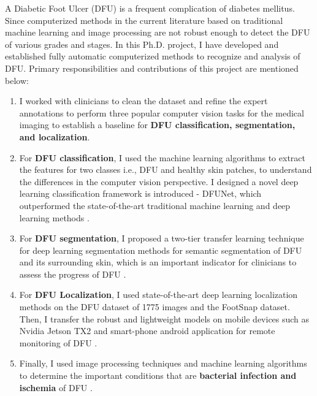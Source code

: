 \documentclass[10pt,a4paper]{article} %
\begin{document}
	\spacedhrule{2em}{-0.6em} %
	
	
	
	
	
	
	
	
	
	\inlineheadsection 
	{A Diabetic Foot Ulcer (DFU) is a frequent complication of diabetes mellitus.} {Since computerized methods in the current literature based on traditional machine learning and image processing are not robust enough to detect the DFU of various grades and stages. In this Ph.D. project, I have developed and established fully automatic computerized methods to recognize and analysis of DFU. Primary responsibilities and contributions of this project are mentioned below:} 
	
	\begin{enumerate}
		\item I worked with clinicians to clean the dataset and refine the expert annotations to perform three popular computer vision tasks for the medical imaging to establish a baseline for \textbf{DFU classification, segmentation, and localization}.
		\item For \textbf{DFU classification}, I used the machine learning algorithms to extract the features for two classes i.e., DFU and healthy skin patches, to understand the differences in the computer vision perspective. I designed a novel deep learning classification framework is introduced - DFUNet, which outperformed the state-of-the-art traditional machine learning and deep learning methods \cite{goyal2018dfunet}.
		\item For \textbf{DFU segmentation}, I proposed a two-tier transfer learning technique for deep learning segmentation methods for semantic segmentation of DFU and its surrounding skin, which is an important indicator for clinicians to assess the progress of DFU \cite{goyal2017fully}.
		\item For \textbf{DFU Localization}, I used state-of-the-art deep learning localization methods on the DFU dataset of 1775 images and the FootSnap dataset. Then, I transfer the robust and lightweight models on mobile devices such as Nvidia Jetson TX2 and smart-phone android application for remote monitoring of DFU \cite{goyal2018robust}.
		\item Finally, I used image processing techniques and machine learning algorithms to determine the important conditions that are \textbf{bacterial infection and ischemia} of DFU \cite{goyal2020recognition}.
	\end{enumerate}    
	
\end{document}
